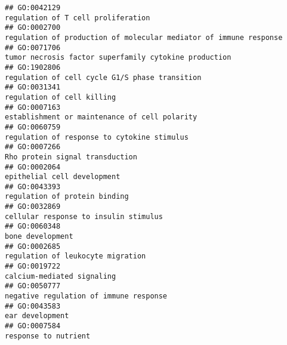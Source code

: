 \documentclass[
]{article}
\begin{document}
\begin{verbatim}
## GO:0042129                                                                                                               regulation of T cell proliferation
## GO:0002700                                                                                regulation of production of molecular mediator of immune response
## GO:0071706                                                                                            tumor necrosis factor superfamily cytokine production
## GO:1902806                                                                                                   regulation of cell cycle G1/S phase transition
## GO:0031341                                                                                                                       regulation of cell killing
## GO:0007163                                                                                                    establishment or maintenance of cell polarity
## GO:0060759                                                                                                      regulation of response to cytokine stimulus
## GO:0007266                                                                                                                  Rho protein signal transduction
## GO:0002064                                                                                                                      epithelial cell development
## GO:0043393                                                                                                                    regulation of protein binding
## GO:0032869                                                                                                            cellular response to insulin stimulus
## GO:0060348                                                                                                                                 bone development
## GO:0002685                                                                                                                regulation of leukocyte migration
## GO:0019722                                                                                                                       calcium-mediated signaling
## GO:0050777                                                                                                           negative regulation of immune response
## GO:0043583                                                                                                                                  ear development
## GO:0007584                                                                                                                             response to nutrient

\end{verbatim}
\end{document}
